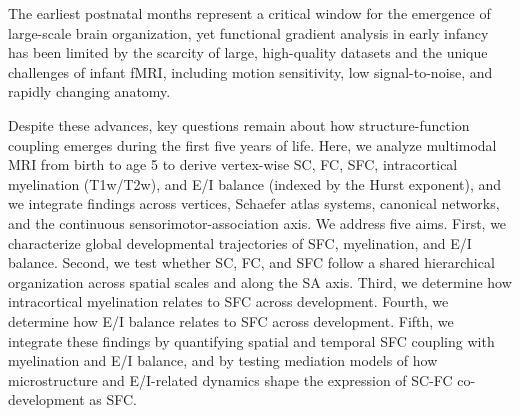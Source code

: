 The earliest postnatal months represent a critical window for the emergence of large-scale brain organization, yet functional gradient analysis in early infancy has been limited by the scarcity of large, high-quality datasets and the unique challenges of infant fMRI, including motion sensitivity, low signal-to-noise, and rapidly changing anatomy.


Despite these advances, key questions remain about how structure-function coupling emerges during the first five years of life. Here, we analyze multimodal MRI from birth to age 5 to derive vertex-wise SC, FC, SFC, intracortical myelination (T1w/T2w), and E/I balance (indexed by the Hurst exponent), and we integrate findings across vertices, Schaefer atlas systems, canonical networks, and the continuous sensorimotor-association axis. We address five aims. First, we characterize global developmental trajectories of SFC, myelination, and E/I balance. Second, we test whether SC, FC, and SFC follow a shared hierarchical organization across spatial scales and along the SA axis. Third, we determine how intracortical myelination relates to SFC across development. Fourth, we determine how E/I balance relates to SFC across development. Fifth, we integrate these findings by quantifying spatial and temporal SFC coupling with myelination and E/I balance, and by testing mediation models of how microstructure and E/I-related dynamics shape the expression of SC-FC co-development as SFC.
